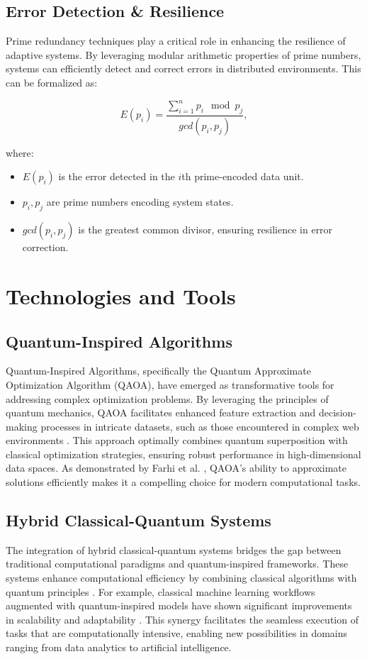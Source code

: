\documentclass{article}
\theoremstyle{plain}
\begin{document}
\subsection{Error Detection \& Resilience}
Prime redundancy techniques play a critical role in enhancing the resilience of adaptive systems. By leveraging modular arithmetic properties of prime numbers, systems can efficiently detect and correct errors in distributed environments. This can be formalized as:

\begin{equation}
    E(p_i) = \frac{\sum_{i=1}^{n} p_i \mod p_j}{gcd(p_i, p_j)},
\end{equation}

where:
\begin{itemize}
    \item $E(p_i)$ is the error detected in the $i$th prime-encoded data unit.
    \item $p_i, p_j$ are prime numbers encoding system states.
    \item $gcd(p_i, p_j)$ is the greatest common divisor, ensuring resilience in error correction.
\end{itemize}
\section{Technologies and Tools}

\subsection{Quantum-Inspired Algorithms}
Quantum-Inspired Algorithms, specifically the Quantum Approximate Optimization Algorithm (QAOA), have emerged as transformative tools for addressing complex optimization problems. By leveraging the principles of quantum mechanics, QAOA facilitates enhanced feature extraction and decision-making processes in intricate datasets, such as those encountered in complex web environments \cite{farhi2014quantum}. This approach optimally combines quantum superposition with classical optimization strategies, ensuring robust performance in high-dimensional data spaces. As demonstrated by Farhi et al. \cite{farhi2014quantum}, QAOA's ability to approximate solutions efficiently makes it a compelling choice for modern computational tasks.

\subsection{Hybrid Classical-Quantum Systems}
The integration of hybrid classical-quantum systems bridges the gap between traditional computational paradigms and quantum-inspired frameworks. These systems enhance computational efficiency by combining classical algorithms with quantum principles \cite{preskill2018quantum}. For example, classical machine learning workflows augmented with quantum-inspired models have shown significant improvements in scalability and adaptability \cite{schuld2019quantum}. This synergy facilitates the seamless execution of tasks that are computationally intensive, enabling new possibilities in domains ranging from data analytics to artificial intelligence.
\end{document}
